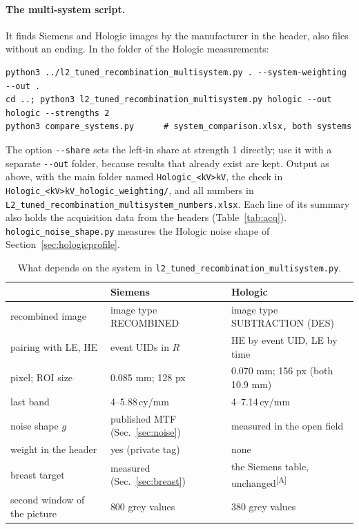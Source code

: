 \documentclass[11pt,a4paper]{article}
\newcommand{\As}{\textsuperscript{[A]}}
\newcommand{\cymm}{\,cy/mm}
\newcommand{\code}[1]{\texttt{#1}}
\begin{document}
\paragraph{The multi-system script.} It finds Siemens and Hologic images by the manufacturer in the header, also files
without an ending. In the folder of the Hologic measurements:
{\small\begin{verbatim}
python3 ../l2_tuned_recombination_multisystem.py . --system-weighting --out .
cd ..; python3 l2_tuned_recombination_multisystem.py hologic --out hologic --strengths 2
python3 compare_systems.py      # system_comparison.xlsx, both systems
\end{verbatim}}
{\sloppy The option \code{-{}-share} sets the left-in share at strength 1 directly; use it with a separate
\code{-{}-out} folder, because results that already exist are kept. Output as above, with the main folder named \code{Hologic\_<kV>kV}, the check in
\code{Hologic\_<kV>kV\_hologic\_weighting/}, and all numbers in \code{L2\_tuned\_recombination\_multisystem\_numbers.xlsx}.
Each line of its summary also holds the acquisition data from the headers (Table~\ref{tab:acq}).
\code{hologic\_noise\_shape.py} measures the Hologic noise shape of Section~\ref{sec:hologicprofile}.\par}

\begin{table}[H]\centering\small
\caption{What depends on the system in \code{l2\_tuned\_recombination\_multisystem.py}.}\label{tab:profiles}
\setlength{\tabcolsep}{4pt}
\begin{tabular}{lll}
\toprule
 & Siemens & Hologic \\
\midrule
recombined image & image type RECOMBINED & image type SUBTRACTION (DES) \\
pairing with LE, HE & event UIDs in $R$ & HE by event UID, LE by time \\
pixel; ROI size & 0.085 mm; 128 px & 0.070 mm; 156 px (both 10.9 mm) \\
last band & 4--5.88\cymm & 4--7.14\cymm \\
noise shape $g$ & published MTF (Sec.~\ref{sec:noise}) & measured in the open field \\
weight in the header & yes (private tag) & none \\
breast target & measured (Sec.~\ref{sec:breast}) & the Siemens table, unchanged\As \\
second window of the picture & 800 grey values & 380 grey values \\
\bottomrule
\end{tabular}
\end{table}
\end{document}
